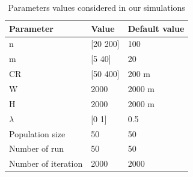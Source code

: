 \begin{table}[!ht]
\begin{center}
\caption{Parameters values considered in our simulations}%
\label{parameters}
\begin{tabular}{p{5cm} p{5cm} p{5cm}}
\hline
\textbf{Parameter}& \textbf{Value} & \textbf{Default value} \\\hline
n&[20 200]&100\\ 
m &[5 40] &20\\ 
CR & [50 400] &200 m\\ 
W&2000 &2000 m\\ 
H&2000&2000 m\\ 
$\lambda$&[0 1]&0.5\\ 
Population size&50&50\\
Number of run&50&50\\
Number of iteration&2000&2000\\ \hline
%
\end{tabular}
\end{center}
\end{table}
